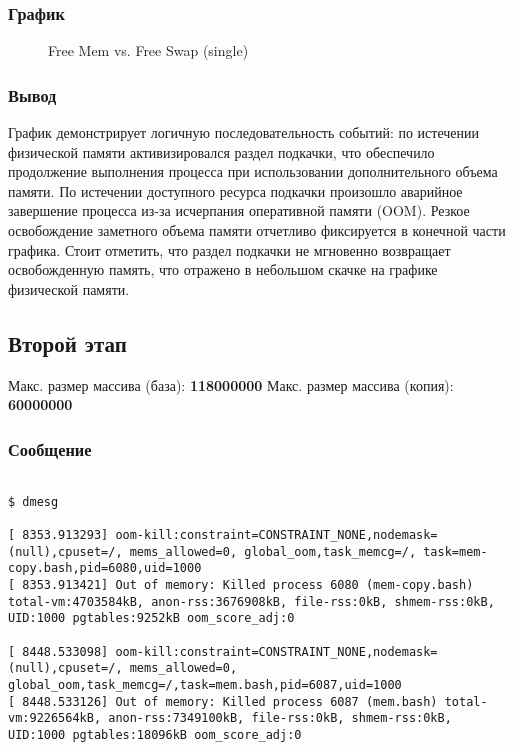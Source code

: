 \documentclass[12pt,a4paper]{article}
\begin{document}
\subsubsection{График}
\begin{figure}[htbp]
  \centering
  
  \caption{Free Mem vs. Free Swap (single)}
\end{figure}

\subsubsection{Вывод}

График демонстрирует логичную последовательность событий: по истечении физической памяти активизировался раздел подкачки, что обеспечило продолжение выполнения процесса при использовании дополнительного объема памяти. По истечении доступного ресурса подкачки произошло аварийное завершение процесса из-за исчерпания оперативной памяти (OOM). Резкое освобождение заметного объема памяти отчетливо фиксируется в конечной части графика. Стоит отметить, что раздел подкачки не мгновенно возвращает освобожденную память, что отражено в небольшом скачке на графике физической памяти.

\subsection{Второй этап}

Макс. размер массива (база): \textbf{118000000}
Макс. размер массива (копия): \textbf{60000000}

\subsubsection{Сообщение}
\begin{verbatim}

$ dmesg

[ 8353.913293] oom-kill:constraint=CONSTRAINT_NONE,nodemask=(null),cpuset=/, mems_allowed=0, global_oom,task_memcg=/, task=mem-copy.bash,pid=6080,uid=1000
[ 8353.913421] Out of memory: Killed process 6080 (mem-copy.bash) total-vm:4703584kB, anon-rss:3676908kB, file-rss:0kB, shmem-rss:0kB, UID:1000 pgtables:9252kB oom_score_adj:0

[ 8448.533098] oom-kill:constraint=CONSTRAINT_NONE,nodemask=(null),cpuset=/, mems_allowed=0, global_oom,task_memcg=/,task=mem.bash,pid=6087,uid=1000
[ 8448.533126] Out of memory: Killed process 6087 (mem.bash) total-vm:9226564kB, anon-rss:7349100kB, file-rss:0kB, shmem-rss:0kB, UID:1000 pgtables:18096kB oom_score_adj:0
\end{verbatim}
\end{document}
